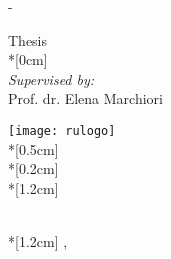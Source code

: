 
\thispagestyle{empty}             %
\calccentering{\unitlength}
\begin{adjustwidth*}{\unitlength}{-\unitlength}
    \begin{adjustwidth}{-0.5cm}{-0.5cm}
        \sffamily
        \begin{flushright}
            \thesistypeabbr{} Thesis\\*[0cm]
            \thesistype{}\\
            \bigskip
            \textit{Supervised by:}\\
            Prof. dr. Elena Marchiori\\
        \end{flushright}
        \vspace*{\fill}
        \noindent
        \texttt{[image: rulogo]}\\*[0.5cm]
        \HUGE \thesistitle{}\\*[0.2cm]
        \Huge \thesissubtitle{}\\*[1.2cm]
        \parbox[b]{0.5\linewidth}{%
            \LARGE 
            \thesisauthor{}\\*[1.2cm]
            \Large
            \thesislocation{}, \monthname[\the\month] \the\year
        }
    \end{adjustwidth}
\end{adjustwidth*}
\normalfont
\normalsize
